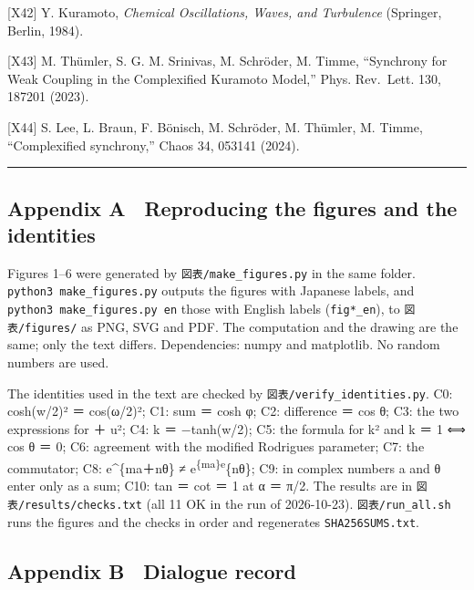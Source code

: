 \documentclass[
  a4paper,
]{article}
\begin{document}
{[}X42{]} Y. Kuramoto, \emph{Chemical Oscillations, Waves, and
Turbulence} (Springer, Berlin, 1984).

{[}X43{]} M. Thümler, S. G. M. Srinivas, M. Schröder, M. Timme,
``Synchrony for Weak Coupling in the Complexified Kuramoto Model,''
Phys. Rev.~Lett. 130, 187201 (2023).

{[}X44{]} S. Lee, L. Braun, F. Bönisch, M. Schröder, M. Thümler, M.
Timme, ``Complexified synchrony,'' Chaos 34, 053141 (2024).

\begin{center}\rule{0.5\linewidth}{0.5pt}\end{center}

\subsection{Appendix A　Reproducing the figures and the
identities}\label{appendix-a-reproducing-the-figures-and-the-identities}

Figures 1--6 were generated by \texttt{図表/\allowbreak{}make\_\allowbreak{}figures.py} in the
same folder. \texttt{python3\ make\_\allowbreak{}figures.py} outputs the figures with
Japanese labels, and \texttt{python3\ make\_\allowbreak{}figures.py\ en} those with
English labels (\texttt{fig*\_\allowbreak{}en}), to \texttt{図表/\allowbreak{}figures/\allowbreak{}} as PNG,
SVG and PDF. The computation and the drawing are the same; only the text
differs. Dependencies: numpy and matplotlib. No random numbers are used.

The identities used in the text are checked by
\texttt{図表/\allowbreak{}verify\_\allowbreak{}identities.py}. C0: \textbar cosh(w/2)\textbar² ＝
\textbar cos(ω/2)\textbar²; C1: sum ＝ cosh φ; C2: difference ＝ cos θ;
C3: the two expressions for  ＋ u\textbar²; C4: k ＝
−tanh(w/2); C5: the formula for \textbar k\textbar² and
\textbar k\textbar{} ＝ 1 ⟺ cos θ ＝ 0; C6: agreement with the modified
Rodrigues parameter; C7: the commutator; C8: e\^{}\{ma＋nθ\} ≠
e\textsuperscript{\{ma\}e}\{nθ\}; C9: in complex numbers a and θ enter
only as a sum; C10: tan ＝ cot ＝ 1 at α ＝ π/2. The results are in
\texttt{図表/\allowbreak{}results/\allowbreak{}checks.txt} (all 11 OK in the run of 2026-10-23).
\texttt{図表/\allowbreak{}run\_\allowbreak{}all.sh} runs the figures and the checks in order and
regenerates \texttt{SHA256SUMS.txt}.

\subsection{Appendix B　Dialogue
record}\label{appendix-b-dialogue-record}
\end{document}
